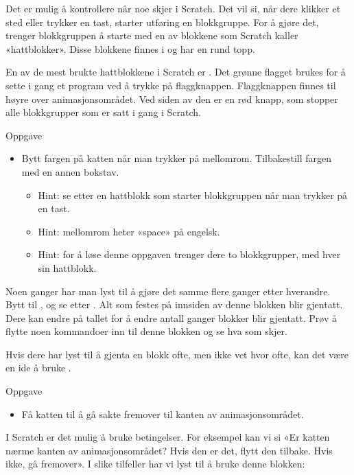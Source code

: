 \documentclass[a4paper,18pt]{article}
\newcommand{\block}[2][-0.4]{\raisebox{#1\height}{\texttt{[image: \#2]}}}
\begin{document}
\begin{large}
\newpage

Det er mulig å kontrollere når noe skjer i Scratch. Det vil si, når dere klikker et sted eller trykker en tast, 
starter utføring en blokkgruppe. For å gjøre det, trenger blokkgruppen å starte med en av blokkene som Scratch 
kaller «hattblokker». Disse blokkene finnes i \block{control} og har en rund topp.

En av de mest brukte hattblokkene i Scratch er \block[-0.32]{flag}. Det grønne flagget brukes for å sette i gang et
program ved å trykke på flaggknappen. Flaggknappen finnes til høyre over animasjonsområdet. Ved siden av den 
er en rød knapp, som stopper alle blokkgrupper som er satt i gang i Scratch.

Oppgave
\begin{itemize}
    \item Bytt fargen på katten når man trykker på mellomrom. Tilbakestill fargen med en annen bokstav.   
        \begin{itemize}
            \item Hint: se etter en hattblokk som starter blokkgruppen når man trykker på en tast.
            \item Hint: mellomrom heter «space» på engelsk.
            \item Hint: for å løse denne oppgaven trenger dere to blokkgrupper, med hver sin hattblokk.
        \end{itemize}
\end{itemize}

\newpage

Noen ganger har man lyst til å gjøre det samme flere ganger etter hverandre. 
Bytt til \block{control}, og se etter \block{repeat}. Alt som festes på innsiden av denne blokken blir gjentatt. 
Dere kan endre på tallet for å endre antall ganger blokker blir gjentatt. Prøv å flytte noen kommandoer inn 
til denne blokken og se hva som skjer.

Hvis dere har lyst til å gjenta en blokk ofte, men ikke vet hvor ofte, kan det være en ide å bruke \block{forever}.

Oppgave
\begin{itemize}
    \item Få katten til å gå sakte fremover til kanten av animasjonsområdet.
\end{itemize}

\newpage

I Scratch er det mulig å bruke betingelser. For eksempel kan vi si «Er katten nærme kanten av animasjonsområdet?
Hvis den er det, flytt den tilbake. Hvis ikke, gå fremover». I slike tilfeller har vi lyst til å bruke denne blokken:
\\
\block{if}


\end{large}
\end{document}
